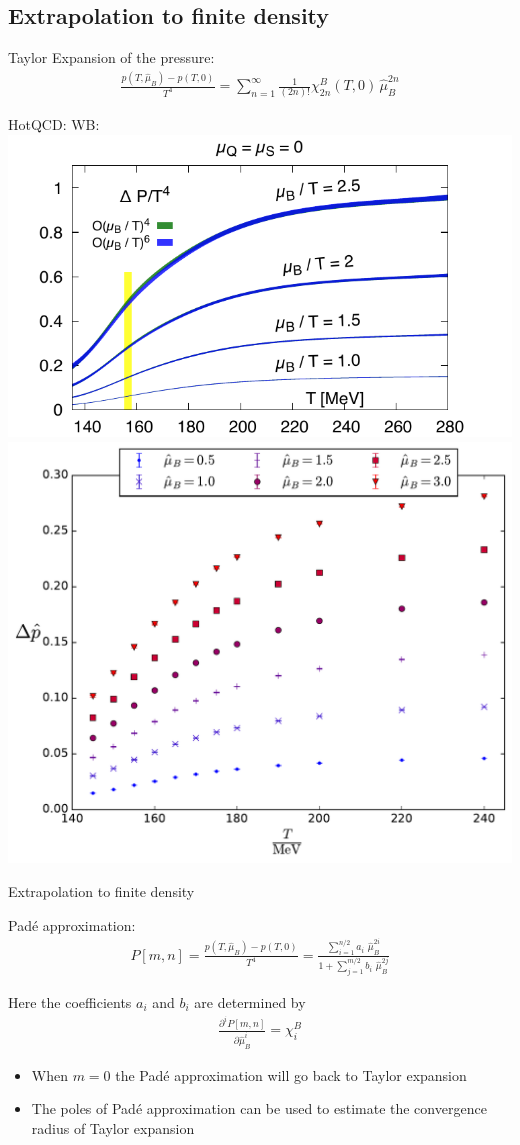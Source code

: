 \subsection{Extrapolation to finite density}

\begin{frame}[fragile]
    \vspace{-0.2cm}
    \begin{block}{Taylor Expansion of the pressure:}
        \begin{align}
            \frac{p(T,\hat{\mu}_B)-p(T,0)}{T^4}=\sum^{\infty}_{n=1}\frac{1}{(2n)!}\chi^B_{2n}(T,0)\,\hat{\mu}_B^{2n}
        \end{align}
    \end{block}
    HotQCD: \hspace{7cm}WB:
    \vspace{0.5cm}
    \includegraphics[width=0.5\linewidth,trim={0 0 0 0.6cm}, clip]{Images/Figures/Temp_BQS000_muB_Order_test.pdf}\hspace{1cm}\includegraphics[width=0.4\linewidth,trim={0 1.3cm 0 0}, clip]{Images/Figures/plot6.pdf}
\end{frame}
\begin{frame}[fragile]{Extrapolation to finite density}
    \vspace{-0.2cm}
    \begin{block}{Pad\'{e} approximation:}
        \begin{align}
            P[m,n]=\frac{p(T,\hat{\mu}_B)-p(T,0)}{T^4}=\frac{\sum^{n/2}_{i=1}a_i\,\,\hat{\mu}_B^{2i}}{1+\sum^{m/2}_{j=1}b_i\,\,\hat{\mu}_B^{2j}}
        \end{align}
    \end{block}
    Here the coefficients $a_i$ and $b_i$ are determined by 
    \begin{align}
       \frac{\partial^iP[m,n]}{\partial\hat{\mu}_B^i}=\chi^B_i
    \end{align}
    \begin{itemize}
    \item When $m=0$ the Pad\'{e} approximation will go back to Taylor expansion
    \item The poles of Pad\'{e} approximation can be used to estimate the convergence radius of Taylor expansion
    \end{itemize}
\end{frame}
